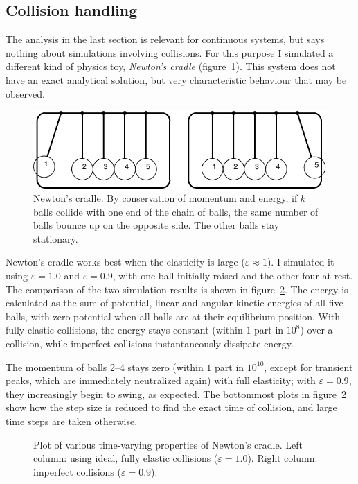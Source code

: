 \subsection{Collision handling\label{evalCollisions}}

The analysis in the last section is relevant for continuous systems, but says nothing about
simulations involving collisions. For this purpose I simulated a different kind of physics toy,
\emph{Newton's cradle} (figure~\ref{cradleFigure}). This system does not have an exact analytical
solution, but very characteristic behaviour that may be observed.

\begin{figure}
\centerline{\includegraphics{figures/cradle}}
\caption{Newton's cradle. By conservation of momentum and energy, if $k$ balls collide with one
    end of the chain of balls, the same number of balls bounce up on the opposite side. The other
    balls stay stationary.\label{cradleFigure}}
\end{figure}

Newton's cradle works best when the elasticity is large ($\varepsilon \approx 1$). I simulated
it using $\varepsilon = 1.0$ and $\varepsilon = 0.9$, with one ball initially raised and the other
four at rest. The comparison of the two simulation results is shown in figure~\ref{cradlePlots}.
The energy is calculated as the sum of potential, linear and angular kinetic energies of all five
balls, with zero potential when all balls are at their equilibrium position. With fully elastic
collisions, the energy stays constant (within $1$ part in $10^8$) over a collision, while
imperfect collisions instantaneously dissipate energy.

The momentum of balls 2--4 stays zero (within $1$ part in $10^{10}$, except for transient peaks,
which are immediately neutralized again) with full elasticity; with $\varepsilon = 0.9$, they
increasingly begin to swing, as expected. The bottommost plots in figure~\ref{cradlePlots}
show how the step size is reduced to find the exact time of collision, and large time steps
are taken otherwise.

\begin{figure}
\centerline{}
\caption{Plot of various time-varying properties of Newton's cradle. Left column: using ideal,
    fully elastic collisions ($\varepsilon = 1.0$). Right column: imperfect collisions
    ($\varepsilon = 0.9$).\label{cradlePlots}}
\end{figure}

